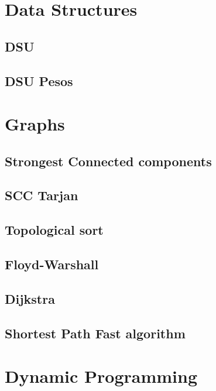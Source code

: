 \section{Data Structures}
\subsection{ DSU}
\raggedbottom
\hrulefill
\subsection{ DSU Pesos}
\raggedbottom
\hrulefill

\section{Graphs}
\subsection{Strongest Connected components}
\raggedbottom
\hrulefill
\subsection{SCC Tarjan}
\raggedbottom
\hrulefill
\subsection{Topological sort}
\raggedbottom
\hrulefill
\subsection{ Floyd-Warshall}
\raggedbottom
\hrulefill
\subsection{   Dijkstra}
\raggedbottom
\hrulefill
\subsection{   Shortest Path Fast algorithm}
\raggedbottom
\hrulefill

\section{Dynamic Programming}
